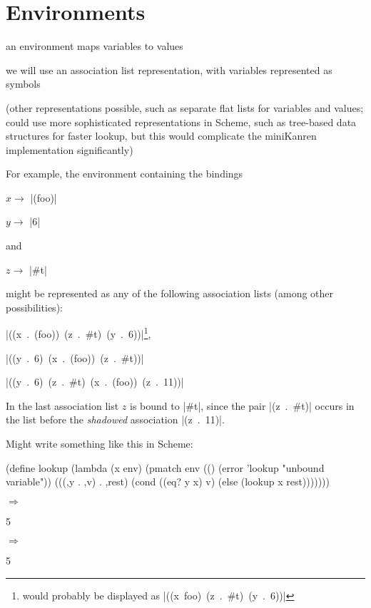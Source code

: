 \chapter{Environments}

an environment maps variables to values

we will use an association list representation, with variables represented as symbols

(other representations possible, such as separate flat lists for
variables and values; could use more sophisticated representations in
Scheme, such as tree-based data structures for faster lookup, but this
would complicate the miniKanren implementation significantly)

For example, the environment containing the bindings

$x \rightarrow$ \schemeresult|(foo)|

$y \rightarrow$ \schemeresult|6|

and

$z \rightarrow$ \schemeresult|#t|

might be represented as any of the following association lists (among other possibilities):

\noindent\mbox{\schemeresult|((x . (foo)) (z . #t) (y . 6))|}\footnote{would probably be displayed as \mbox{\schemeresult|((x foo) (z . #t) (y . 6))|}},

\noindent\mbox{\schemeresult|((y . 6) (x . (foo)) (z . #t))|}

\noindent\mbox{\schemeresult|((y . 6) (z . #t) (x . (foo)) (z . 11))|}

\noindent
In the last association list $z$ is bound to \schemeresult|#t|, since the pair \mbox{\schemeresult|(z . #t)|}
occurs in the list before the \emph{shadowed} association \mbox{\schemeresult|(z . 11)|}.


Might write something like this in Scheme:

\begin{schemedisplay}
(define lookup
  (lambda (x env)
    (pmatch env
      (() (error 'lookup "unbound variable"))
      (((,y . ,v) . ,rest)
       (cond
         ((eq? y x) v)
         (else (lookup x rest)))))))
\end{schemedisplay}


\noindent{} $\Rightarrow$
\begin{schemeresponsebox}5\end{schemeresponsebox}


\noindent{} $\Rightarrow$
\begin{schemeresponsebox}5\end{schemeresponsebox}


